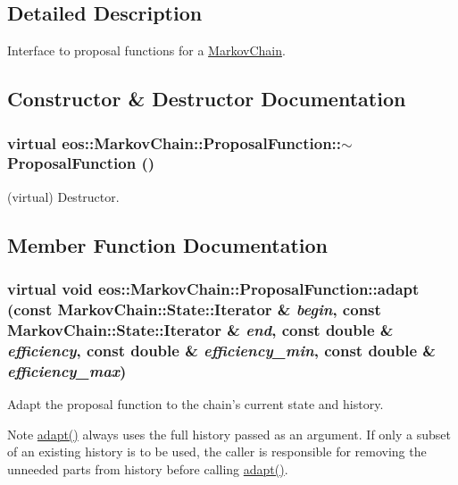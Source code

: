 \subsection{Detailed Description}
Interface to proposal functions for a \hyperlink{classeos_1_1MarkovChain}{MarkovChain}. 

\subsection{Constructor \& Destructor Documentation}
\hypertarget{structeos_1_1MarkovChain_1_1ProposalFunction_a758ad6e18e36b15062fe776ee7a9b3d9}{
\subsubsection[{$\sim$ProposalFunction}]{\setlength{\rightskip}{0pt plus 5cm}virtual eos::MarkovChain::ProposalFunction::$\sim$ProposalFunction ()}}
\label{structeos_1_1MarkovChain_1_1ProposalFunction_a758ad6e18e36b15062fe776ee7a9b3d9}


(virtual) Destructor. 

\subsection{Member Function Documentation}
\hypertarget{structeos_1_1MarkovChain_1_1ProposalFunction_afee6a937c53b9cfb257a5cd724a54296}{
\subsubsection[{adapt}]{\setlength{\rightskip}{0pt plus 5cm}virtual void eos::MarkovChain::ProposalFunction::adapt (const {\bf MarkovChain::State::Iterator} \& {\em begin}, \/  const {\bf MarkovChain::State::Iterator} \& {\em end}, \/  const double \& {\em efficiency}, \/  const double \& {\em efficiency\_\-min}, \/  const double \& {\em efficiency\_\-max})}}
\label{structeos_1_1MarkovChain_1_1ProposalFunction_afee6a937c53b9cfb257a5cd724a54296}
Adapt the proposal function to the chain's current state and history. \begin{DoxyNote}{Note}
\hyperlink{structeos_1_1MarkovChain_1_1ProposalFunction_afee6a937c53b9cfb257a5cd724a54296}{adapt()} always uses the full history passed as an argument. If only a subset of an existing history is to be used, the caller is responsible for removing the unneeded parts from history before calling \hyperlink{structeos_1_1MarkovChain_1_1ProposalFunction_afee6a937c53b9cfb257a5cd724a54296}{adapt()}. 
\end{DoxyNote}


